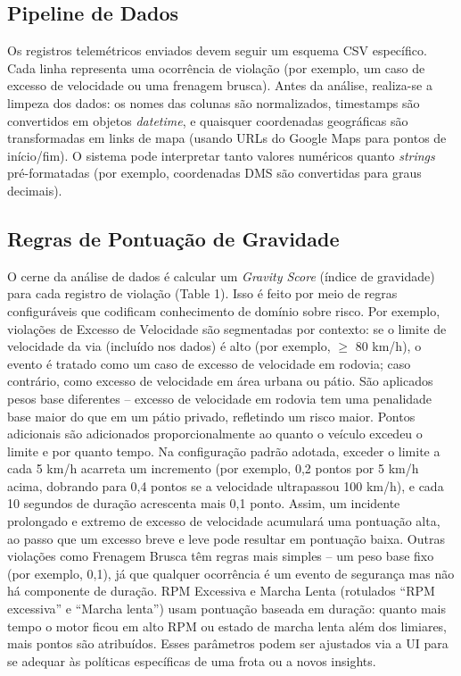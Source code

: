 \documentclass[12pt]{article}
\begin{document}
\subsection{Pipeline de Dados}

Os registros telemétricos enviados devem seguir um esquema CSV específico. Cada linha representa uma ocorrência de violação (por exemplo, um caso de excesso de velocidade ou uma frenagem brusca). Antes da análise, realiza-se a limpeza dos dados: os nomes das colunas são normalizados, timestamps são convertidos em objetos \textit{datetime}, e quaisquer coordenadas geográficas são transformadas em links de mapa (usando URLs do Google Maps para pontos de início/fim). O sistema pode interpretar tanto valores numéricos quanto \textit{strings} pré-formatadas (por exemplo, coordenadas DMS são convertidas para graus decimais). 

\subsection{Regras de Pontuação de Gravidade}

O cerne da análise de dados é calcular um \textit{Gravity Score} (índice de gravidade) para cada registro de violação (Table 1). Isso é feito por meio de regras configuráveis que codificam conhecimento de domínio sobre risco. Por exemplo, violações de Excesso de Velocidade são segmentadas por contexto: se o limite de velocidade da via (incluído nos dados) é alto (por exemplo, $\ge$ 80 km/h), o evento é tratado como um caso de excesso de velocidade em rodovia; caso contrário, como excesso de velocidade em área urbana ou pátio. São aplicados pesos base diferentes – excesso de velocidade em rodovia tem uma penalidade base maior do que em um pátio privado, refletindo um risco maior. Pontos adicionais são adicionados proporcionalmente ao quanto o veículo excedeu o limite e por quanto tempo. Na configuração padrão adotada, exceder o limite a cada 5 km/h acarreta um incremento (por exemplo, 0,2 pontos por 5 km/h acima, dobrando para 0,4 pontos se a velocidade ultrapassou 100 km/h), e cada 10 segundos de duração acrescenta mais 0,1 ponto. Assim, um incidente prolongado e extremo de excesso de velocidade acumulará uma pontuação alta, ao passo que um excesso breve e leve pode resultar em pontuação baixa. Outras violações como Frenagem Brusca têm regras mais simples – um peso base fixo (por exemplo, 0,1), já que qualquer ocorrência é um evento de segurança mas não há componente de duração. RPM Excessiva e Marcha Lenta (rotulados “RPM excessiva” e “Marcha lenta”) usam pontuação baseada em duração: quanto mais tempo o motor ficou em alto RPM ou estado de marcha lenta além dos limiares, mais pontos são atribuídos. Esses parâmetros podem ser ajustados via a UI para se adequar às políticas específicas de uma frota ou a novos insights. 
\end{document}

